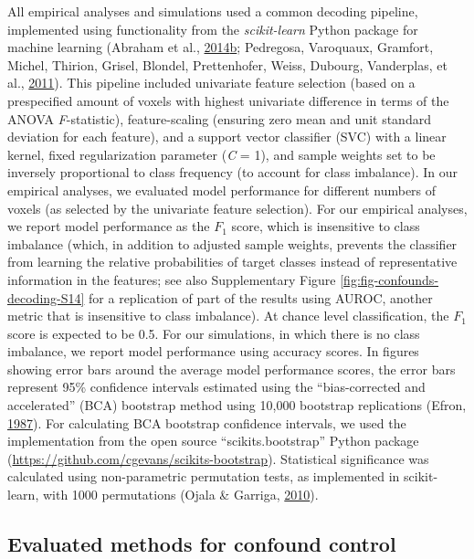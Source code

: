 \documentclass[11pt,american,a4paper,oneside,]{memoir} %
\begin{document}
All empirical analyses and simulations used a common decoding pipeline, implemented using functionality from the \emph{scikit-learn} Python package for machine learning (Abraham et al., \protect\hyperlink{ref-Abraham2014-ef}{2014}\protect\hyperlink{ref-Abraham2014-ef}{b}; Pedregosa, Varoquaux, Gramfort, Michel, Thirion, Grisel, Blondel, Prettenhofer, Weiss, Dubourg, Vanderplas, et al., \protect\hyperlink{ref-Pedregosa2011-bp}{2011}). This pipeline included univariate feature selection (based on a prespecified amount of voxels with highest univariate difference in terms of the ANOVA \emph{F}-statistic), feature-scaling (ensuring zero mean and unit standard deviation for each feature), and a support vector classifier (SVC) with a linear kernel, fixed regularization parameter (\emph{C} = 1), and sample weights set to be inversely proportional to class frequency (to account for class imbalance). In our empirical analyses, we evaluated model performance for different numbers of voxels (as selected by the univariate feature selection). For our empirical analyses, we report model performance as the \(F_{1}\) score, which is insensitive to class imbalance (which, in addition to adjusted sample weights, prevents the classifier from learning the relative probabilities of target classes instead of representative information in the features; see also Supplementary Figure \ref{fig:fig-confounds-decoding-S14} for a replication of part of the results using AUROC, another metric that is insensitive to class imbalance). At chance level classification, the \(F_{1}\) score is expected to be 0.5. For our simulations, in which there is no class imbalance, we report model performance using accuracy scores. In figures showing error bars around the average model performance scores, the error bars represent 95\% confidence intervals estimated using the ``bias-corrected and accelerated'' (BCA) bootstrap method using 10,000 bootstrap replications (Efron, \protect\hyperlink{ref-efron1987better}{1987}). For calculating BCA bootstrap confidence intervals, we used the implementation from the open source ``scikits.bootstrap'' Python package (\url{https://github.com/cgevans/scikits-bootstrap}). Statistical significance was calculated using non-parametric permutation tests, as implemented in scikit-learn, with 1000 permutations (Ojala \& Garriga, \protect\hyperlink{ref-Ojala2010-rc}{2010}).

\hypertarget{confounds-decoding-methods-evaluated-methods}{%
\subsection{Evaluated methods for confound control}\label{confounds-decoding-methods-evaluated-methods}}
\end{document}
